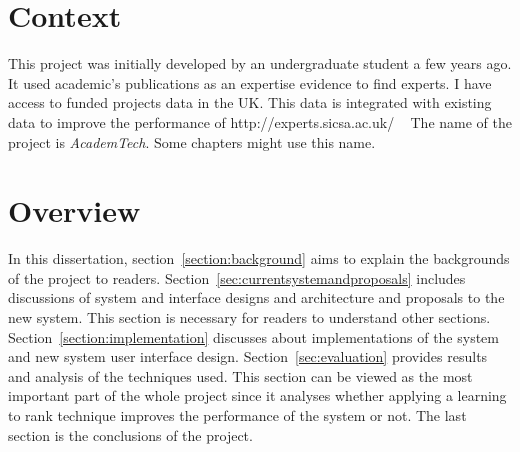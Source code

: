 \section{Context}
This project was initially developed by an undergraduate student a few years ago. It used academic's publications as an expertise evidence to find experts.
I have access to funded projects data in the UK. This data is integrated with existing data to improve the performance of http://experts.sicsa.ac.uk/ ~\cite{sicsasearch}
The name of the project is \textit{AcademTech}. Some chapters might use this name.

\section{Overview}
In this dissertation, section~\ref{section:background} aims to explain the backgrounds of the project to readers. 
Section~\ref{sec:currentsystemandproposals} includes discussions of system and interface designs and architecture and proposals to the new system.
This section is necessary for readers to understand other sections. 
Section~\ref{section:implementation} discusses about implementations of the system and new system user interface design. 
Section~\ref{sec:evaluation} provides results and analysis of the techniques used. 
This section can be viewed as the most important part of the whole project since it 
analyses whether applying a learning to rank technique improves the performance of the system or not. 
The last section is the conclusions of the project.
